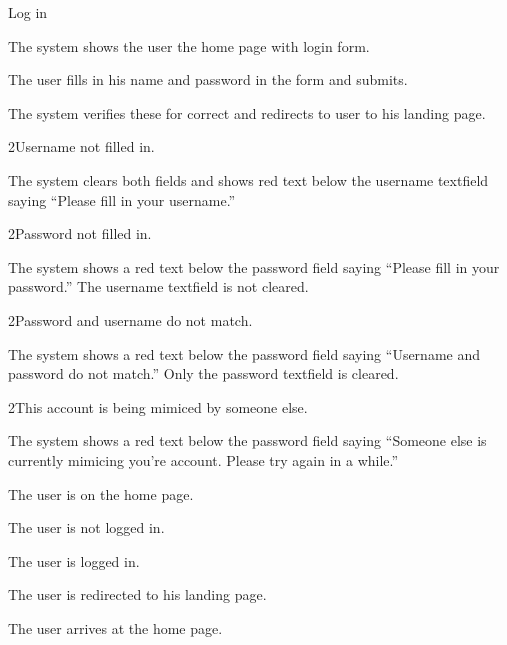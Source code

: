 
\begin{uc}{Log in}

    \begin{uc-mss}
    \item The system shows the user the home page with login form.
    \item The user fills in his name and password in the form and submits.
    \item The system verifies these for correct and redirects to user to his
        landing page.
    \end{uc-mss}

    \begin{uc-ext}

        \begin{uc-fail}{2}{Username not filled in.}
        \item The system clears both fields and shows red text below the
            username textfield saying ``Please fill in your username.''
        \end{uc-fail}

        \begin{uc-fail}{2}{Password not filled in.}
        \item The system shows a red text below the password field saying
            ``Please fill in your password.'' The username textfield is not
            cleared.
        \end{uc-fail}

        \begin{uc-fail}{2}{Password and username do not match.}
        \item The system shows a red text below the password field saying
            ``Username and password do not match.'' Only the password textfield
            is cleared.
        \end{uc-fail}
				
				\begin{uc-fail}{2}{This account is being mimiced by someone else. }
        \item The system shows a red text below the password field saying
            ``Someone else is currently mimicing you're account. Please try again in a while.'' 
        \end{uc-fail}

    \end{uc-ext}

    \begin{uc-pre}
    \item The user is on the home page.
    \item The user is not logged in.
    \end{uc-pre}

    \begin{uc-post}
    \item The user is logged in.
    \item The user is redirected to his landing page.
    \end{uc-post}

    \begin{uc-trig}
        The user arrives at the home page.
    \end{uc-trig}

\end{uc}

